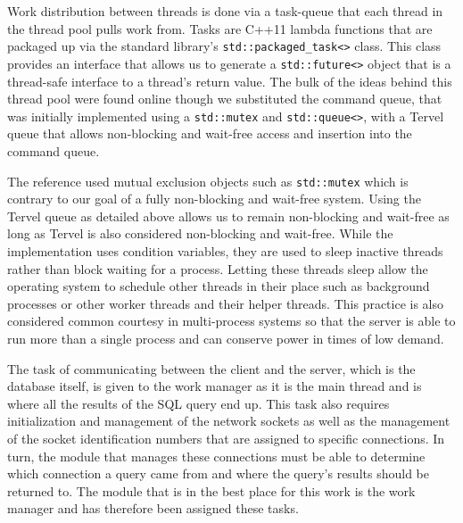 \documentclass[letterpaper, 12pt]{article}
\begin{document}
Work distribution between threads is done via a task-queue that each thread in the
thread pool pulls work from. Tasks are C++11 lambda functions that are packaged up 
via the standard library's \lstinline[basicstyle=\ttfamily]|std::packaged_task<>|
 class. 
This class provides an interface that allows us to generate a \lstinline[basicstyle=\ttfamily]|std::future<>| 
object that is a thread-safe interface to a thread's return value. The bulk of the 
ideas behind this thread pool were found online \cite{stackoverflow1} though we substituted
the command queue, that was initially implemented using a \lstinline[basicstyle=\ttfamily]|std::mutex|
and \lstinline[basicstyle=\ttfamily]|std::queue<>|, with a Tervel queue that allows
non-blocking and wait-free access and insertion into the command queue.
\par\vspace{\baselineskip}
The reference used mutual exclusion objects such as \lstinline[basicstyle=\ttfamily]|std::mutex|
which is contrary to our goal of a fully non-blocking and wait-free system. Using the Tervel
queue as detailed above allows us to remain non-blocking and wait-free as long as Tervel
is also considered non-blocking and wait-free. While the implementation uses condition variables,
they are used to sleep inactive threads rather than block waiting for a process. Letting these 
threads sleep allow the operating system to schedule other threads in their place such as 
background processes or other worker threads and their helper threads. This practice is also 
considered common courtesy in multi-process systems so that the server is able to run more than
a single process and can conserve power in times of low demand.
\par\vspace{\baselineskip}
The task of communicating between the client and the server, which is the database itself,
is given to the work manager as it is the main thread and is where all the results of
the SQL query end up. This task also requires initialization and management of the network
sockets as well as the management of the socket identification numbers that are assigned
to specific connections. In turn, the module that manages these connections must be able to
determine which connection a query came from and where the query's results should be
returned to. The module that is in the best place for this work is the work manager
and has therefore been assigned these tasks.
\par\vspace{\baselineskip}
\end{document}
